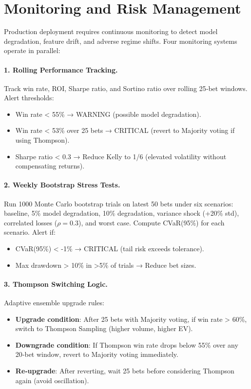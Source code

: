 \section{Monitoring and Risk Management}
\label{sec:monitoring}

Production deployment requires continuous monitoring to detect model degradation, feature drift, and adverse regime shifts. Four monitoring systems operate in parallel:

\paragraph{1. Rolling Performance Tracking.}
Track win rate, ROI, Sharpe ratio, and Sortino ratio over rolling 25‑bet windows. Alert thresholds:
\begin{itemize}
\item Win rate < 55\% → WARNING (possible model degradation).
\item Win rate < 53\% over 25 bets → CRITICAL (revert to Majority voting if using Thompson).
\item Sharpe ratio < 0.3 → Reduce Kelly to 1/6 (elevated volatility without compensating returns).
\end{itemize}

\paragraph{2. Weekly Bootstrap Stress Tests.}
Run 1000 Monte Carlo bootstrap trials on latest 50 bets under six scenarios: baseline, 5\% model degradation, 10\% degradation, variance shock (+20\% std), correlated losses ($\rho=0.3$), and worst case. Compute CVaR(95\%) for each scenario. Alert if:
\begin{itemize}
\item CVaR(95\%) < -1\% → CRITICAL (tail risk exceeds tolerance).
\item Max drawdown > 10\% in >5\% of trials → Reduce bet sizes.
\end{itemize}

\paragraph{3. Thompson Switching Logic.}
Adaptive ensemble upgrade rules:
\begin{itemize}
\item \textbf{Upgrade condition}: After 25 bets with Majority voting, if win rate > 60\%, switch to Thompson Sampling (higher volume, higher EV).
\item \textbf{Downgrade condition}: If Thompson win rate drops below 55\% over any 20‑bet window, revert to Majority voting immediately.
\item \textbf{Re‑upgrade}: After reverting, wait 25 bets before considering Thompson again (avoid oscillation).
\end{itemize}


